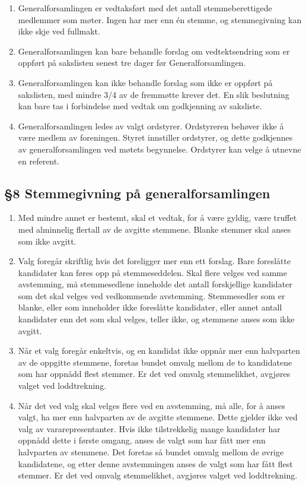 \documentclass[a4paper,11pt,titlepage]{article}
\begin{document}
\begin{enumerate}
\item Generalforsamlingen er vedtaksført med det antall stemmeberettigede medlemmer som møter. Ingen har mer enn én stemme, og stemmegivning kan ikke skje ved fullmakt.

\item Generalforsamlingen kan bare behandle forslag om vedtektsendring som er oppført på sakslisten senest tre dager før Generalforsamlingen.

\item Generalforsamlingen kan ikke behandle forslag som ikke er oppført på sakslisten, med mindre 3/4 av de fremmøtte krever det. En slik beslutning kan bare tas i forbindelse med vedtak om godkjenning av saksliste.

\item Generalforsamlingen ledes av valgt ordstyrer. Ordstyreren behøver ikke å være medlem av foreningen. Styret innstiller ordstyrer, og dette godkjennes av generalforsamlingen ved møtets begynnelse. Ordstyrer kan velge å utnevne en referent.

\end{enumerate}

\subsection*{§8 Stemmegivning på generalforsamlingen}

\begin{enumerate}

\item Med mindre annet er bestemt, skal et vedtak, for å være gyldig, være truffet med alminnelig flertall av de avgitte stemmene. Blanke stemmer skal anses som ikke avgitt.

\item Valg foregår skriftlig hvis det foreligger mer enn ett forslag. Bare foreslåtte kandidater kan føres opp på stemmeseddelen. Skal flere velges ved samme avstemming, må stemmesedlene inneholde det antall forskjellige kandidater som det skal velges ved vedkommende avstemming. Stemmesedler som er blanke, eller som inneholder ikke foreslåtte kandidater, eller annet antall kandidater enn det som skal velges, teller ikke, og stemmene anses som ikke avgitt.

\item Når et valg foregår enkeltvis, og en kandidat ikke oppnår mer enn halvparten av de oppgitte stemmene, foretas bundet omvalg mellom de to kandidatene som har oppnådd flest stemmer. Er det ved omvalg stemmelikhet, avgjøres valget ved loddtrekning.

\item Når det ved valg skal velges flere ved en avstemming, må alle, for å anses valgt, ha mer enn halvparten av de avgitte stemmene. Dette gjelder ikke ved valg av vararepresentanter. Hvis ikke tilstrekkelig mange kandidater har oppnådd dette i første omgang, anses de valgt som har fått mer enn halvparten av stemmene. Det foretas så bundet omvalg mellom de øvrige kandidatene, og etter denne avstemmingen anses de valgt som har fått flest stemmer. Er det ved omvalg stemmelikhet, avgjøres valget ved loddtrekning.

\end{enumerate}
\end{document}
